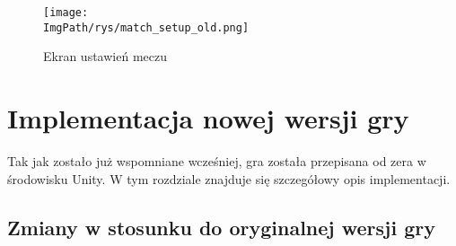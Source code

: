 \documentclass[a4paper,12pt,twoside,openany]{report}
\newcommand{\ImgPath}{.}
\begin{document}
\begin{figure}[!htbp]
	\begin{center}
\centering
\texttt{[image: \\ImgPath/rys/match\_setup\_old.png]}
\end{center}
	\caption{Ekran ustawień meczu}
	\label{match_setup_old}
\end{figure}


\chapter{Implementacja nowej wersji gry}

Tak jak zostało już wspomniane wcześniej, gra została przepisana od zera w środowisku Unity. W tym rozdziale znajduje się szczegółowy opis implementacji.

\section{Zmiany w stosunku do oryginalnej wersji gry}
\end{document}
